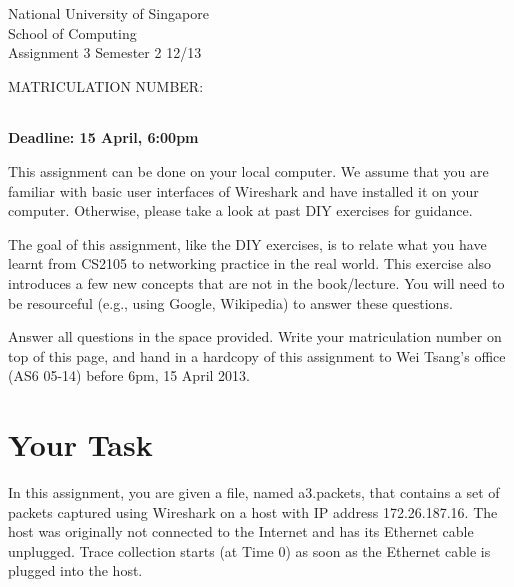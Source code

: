\documentclass[a4paper,12pt,answers]{exam}
\begin{document}
\extraheadheight{.5in}
%
{\large\sf National University of Singapore\\ School of Computing \\
\LARGE\sf Assignment 3}%
{\large\sf Semester 2 12/13}
\firstpageheadrule
\pagestyle{headandfoot}

\begin{center}
{\Large{\sf MATRICULATION NUMBER:}}
\begin{tabular}{| c | c | c | c | c | c | c | c | c |}
\hline
\hspace{.3cm} &
\hspace{.3cm} &
\hspace{.3cm} &
\hspace{.3cm} &
\hspace{.3cm} &
\hspace{.3cm} &
\hspace{.3cm} &
\hspace{.3cm} &
\hspace{.3cm} \\[11pt]
\hline
\end{tabular}
\end{center}

\textbf{Deadline: 15 April, 6:00pm}

This assignment can be done on your local computer.  We assume that you are familiar with basic user interfaces of Wireshark and have installed it on your computer.  Otherwise, please take a look at past DIY exercises for guidance.

The goal of this assignment, like the DIY exercises, is to relate what you have learnt from CS2105 to networking practice in the real world.  This exercise also introduces a few new concepts that are not in the book/lecture.  You will need to be resourceful (e.g., using Google, Wikipedia) to answer these questions.

Answer all questions in the space provided.  Write your matriculation number on top of this page, and hand in a hardcopy of this assignment to Wei Tsang's office (AS6 05-14) before 6pm, 15 April 2013.

\section*{Your Task}

In this assignment, you are given a file, named a3.packets, that contains a set of packets captured using Wireshark on a host with IP address 172.26.187.16.  The host was originally not connected to the Internet and has its Ethernet cable unplugged.  Trace collection starts (at Time 0) as soon as the Ethernet cable is plugged into the host.  
\end{document}
